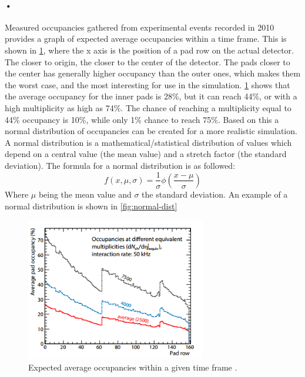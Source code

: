 \documentclass[a4paper, 12pt, openright, twoside]{report}
\begin{document}
\paragraph{•}
Measured occupancies gathered from experimental events recorded in 2010 provides a graph of expected average occupancies within a time frame.
This is shown in \ref{fig:expected-occupancy}, where the x axis is the position of a pad row on the actual detector.
The closer to origin, the closer to the center of the detector.
The pads closer to the center has generally higher occupancy than the outer ones, which makes them the worst case, and the most interesting for use in the simulation.
\ref{fig:expected-occupancy} shows that the average occupancy for the inner pads is 28\%, but it can reach 44\%, or with a high multiplicity as high as 74\%.
The chance of reaching a multiplicity equal to 44\% occupancy is 10\%, while only 1\% chance to reach 75\%.
Based on this a normal distribution of occupancies can be created for a more realistic simulation.
A normal distribution is a mathematical/statistical distribution of values which depend on a central value (the mean value) and a stretch factor (the standard deviation)\cite{normal-dist}.
The formula for a normal distribution is as followed: 
\begin{equation}
f(x,\mu,\sigma) = \frac{1}{\sigma}\phi(\frac{x-\mu}{\sigma})  
\end{equation}
Where $ \mu$ being the mean value and $ \sigma$ the standard deviation. 
An example of a normal distribution is shown in \ref{fig:normal-dist}

\begin{figure}[h!]
	\centering
		\includegraphics[width=0.7\textwidth]{images/expected-occupancy.png}
		\caption[Expected average occupancies within a given time frame for the entire detector.]{Expected average occupancies within a given time frame \cite{tdr-016}.}
		\label{fig:expected-occupancy}
\end{figure}
\end{document}
